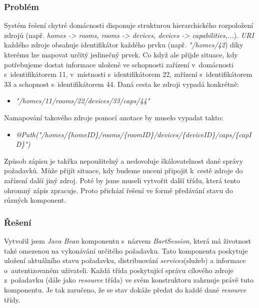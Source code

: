 \subsubsection*{Problém}
Systém řešení chytré domácnosti disponuje strukturou hierarchického rozpoložení zdrojů (např. \emph{homes -> rooms, rooms -> devices, devices -> capabilities,...}).
\emph{URI} každého zdroje obsahuje identifikátor každého prvku (např. \emph{"/homes/42}) díky kterému lze mapovat určitý jedinečný prvek.
Co když ale přijde situace, kdy potřebujeme dostat informace uložené ve schopnosti zařízení v~domácnosti s~identifikátorem 11, v~místnosti s~identifikátorem 22, zařízení s~identifikátorem 33 a schopnost s~identifikátorem 44.
\newline
Daná cesta ke zdroji vypadá konkrétně:
\begin{itemize}
  \item \emph{"/homes/11/rooms/22/devices/33/caps/44"}
\end{itemize}

Namapování takového zdroje pomocí anotace  by muselo vypadat takto:
\begin{itemize}
  \item \emph{@Path("/homes/\{homeID\}/rooms/\{roomID\}/devices/\{deviceID\}/caps/\{capID\}")}
\end{itemize}

Způsob zápisu je takřka nepoužitelný a nedovoluje škálovatelnost dané správy požadavků.
Může přijít situace, kdy budeme nuceni připojit k~cestě zdroje do zařízení další jiný zdroj.
Poté by jsme museli vytvořit další třídu, která tento ohromný zápis zpracuje.
Proto přichází řešení ve formě předávání stavu do různých komponent.

\subsubsection*{Řešení}
Vytvořil jsem \emph{Java Bean} komponentu s~názvem \emph{BartSession}, která má životnost také omezenou na vykonávání určitého požadavku.
Tato komponenta poskytuje uložení aktuálního stavu požadavku, distribuování \emph{services}(služeb) a informace o~autentizovaném uživateli.
Každá třída poskytující správu cílového zdroje z~požadavku (dále jako \emph{resource} třída) ve svém konstruktoru zahrnuje právě tuto komponentu.
Je tak zaručeno, že se stav dokáže předat do každé dané \emph{resource} třídy.

